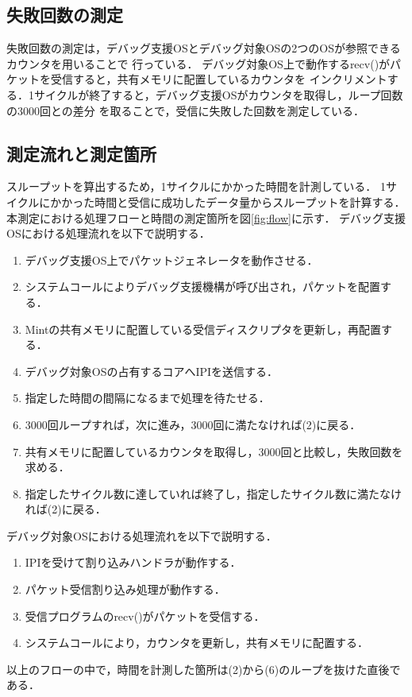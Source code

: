 \documentclass[12pt]{jsarticle}
\def\labelenumi{(\theenumi)}
\begin{document}
\subsection{失敗回数の測定}
失敗回数の測定は，デバッグ支援OSとデバッグ対象OSの2つのOSが参照できるカウンタを用いることで
行っている．
デバッグ対象OS上で動作するrecv()がパケットを受信すると，共有メモリに配置しているカウンタを
インクリメントする．1サイクルが終了すると，デバッグ支援OSがカウンタを取得し，ループ回数の3000回との差分
を取ることで，受信に失敗した回数を測定している．

\subsection{測定流れと測定箇所}
スループットを算出するため，1サイクルにかかった時間を計測している．
1サイクルにかかった時間と受信に成功したデータ量からスループットを計算する．
本測定における処理フローと時間の測定箇所を図\ref{fig:flow}に示す．
デバッグ支援OSにおける処理流れを以下で説明する．
\begin{enumerate}
    \item デバッグ支援OS上でパケットジェネレータを動作させる．
    \item システムコールによりデバッグ支援機構が呼び出され，パケットを配置する．
    \item Mintの共有メモリに配置している受信ディスクリプタを更新し，再配置する．
    \item デバッグ対象OSの占有するコアへIPIを送信する．
    \item 指定した時間の間隔になるまで処理を待たせる．
    \item 3000回ループすれば，次に進み，3000回に満たなければ(2)に戻る．
    \item 共有メモリに配置しているカウンタを取得し，3000回と比較し，失敗回数を求める．
    \item 指定したサイクル数に達していれば終了し，指定したサイクル数に満たなければ(2)に戻る．
\end{enumerate}
デバッグ対象OSにおける処理流れを以下で説明する．
\begin{enumerate}
        \renewcommand{\labelenumi}{(\Alph{enumi})}
    \item IPIを受けて割り込みハンドラが動作する．
    \item パケット受信割り込み処理が動作する．
    \item 受信プログラムのrecv()がパケットを受信する．
    \item システムコールにより，カウンタを更新し，共有メモリに配置する．
\end{enumerate}
以上のフローの中で，時間を計測した箇所は(2)から(6)のループを抜けた直後である．
\end{document}
